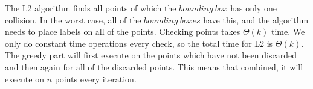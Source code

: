 \documentclass[crop=false,a4paper,oneside,11pt]{article}
\begin{document}
The L2 algorithm finds all points of which the $bounding \ box$ has only one collision. In the worst case, all of the $bounding \ boxes$ have this, and the algorithm needs to place labels on all of the points. Checking points takes $\Theta(k)$ time. We only do constant time operations every check, so the total time for L2 is $\Theta(k)$. \\
The greedy part will first execute on the points which have not been discarded and then again for all of the discarded points. This means that combined, it will execute on $n$ points every iteration.  
\end{document}

